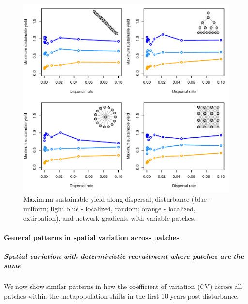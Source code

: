 \documentclass[]{article}
\let\oldparagraph\paragraph
\renewcommand{\paragraph}[1]{\oldparagraph{#1}\mbox{}}
\let\oldsubparagraph\subparagraph
\renewcommand{\subparagraph}[1]{\oldsubparagraph{#1}\mbox{}}
\begin{document}
\begin{figure}[H]

{\centering \includegraphics{Managing_for_ecological_surprises_in_metapopulations_makeHTML_files/figure-latex/MSY with variable patches and space-time stochasticity-1} 

}

\caption{Maximum sustainable yield along dispersal, disturbance (blue - uniform; light blue - localized, random; orange - localized, extirpation), and network gradients with variable patches.}\label{fig:MSY with variable patches and space-time stochasticity}
\end{figure}

\paragraph{General patterns in spatial variation across
patches}\label{general-patterns-in-spatial-variation-across-patches}

\subparagraph{Spatial variation with deterministic recruitment where
patches are the
same}\label{spatial-variation-with-deterministic-recruitment-where-patches-are-the-same}

We now show similar patterns in how the coefficient of variation (CV)
across all patches within the metapopulation shifts in the first 10
years post-disturbance.
\end{document}
